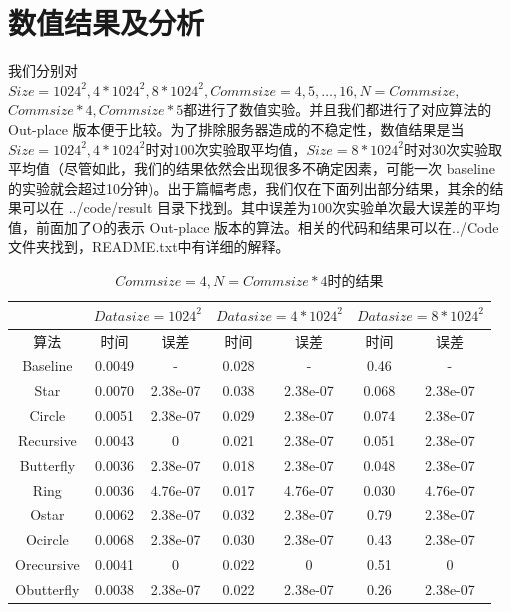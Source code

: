 \documentclass{article}
\begin{document}
\section{数值结果及分析}
我们分别对 $Size = 1024^2, 4*1024^2, 8*1024^2, Commsize=4,5,\dots,16,N = Commsize,$ $Commsize*4,Commsize*5$都进行了数值实验。并且我们都进行了对应算法的 Out-place 版本便于比较。为了排除服务器造成的不稳定性，数值结果是当$Size=1024^2, 4*1024^2$时对$100$次实验取平均值，$Size=8*1024^2$时对$30$次实验取平均值（尽管如此，我们的结果依然会出现很多不确定因素，可能一次 baseline 的实验就会超过10分钟)。出于篇幅考虑，我们仅在下面列出部分结果，其余的结果可以在 ../code/result 目录下找到。其中误差为$100$次实验单次最大误差的平均值，前面加了O的表示 Out-place 版本的算法。相关的代码和结果可以在../Code文件夹找到，README.txt中有详细的解释。
\begin{table}[H]
	\centering
	\begin{tabular}{c|cc|cc|cc}
		 & \multicolumn{2}{|c|}{$Datasize=1024^2$}  &\multicolumn{2}{|c|}{$Datasize=4*1024^2$}&\multicolumn{2}{c}{$Datasize=8*1024^2$}\\\hline
		算法 &时间 &误差 &时间 &误差 &时间 &误差\\ \hline
		Baseline &0.0049&-&0.028&-&0.46&-\\
		Star& 0.0070&2.38e-07&0.038&2.38e-07&0.068& 2.38e-07\\ 
		Circle &0.0051&2.38e-07&0.029&2.38e-07&0.074&2.38e-07\\ 
		Recursive &0.0043&0&0.021&2.38e-07&0.051&2.38e-07 \\
		Butterfly &0.0036&2.38e-07&0.018&2.38e-07&0.048&2.38e-07\\
		Ring &0.0036&4.76e-07&0.017&4.76e-07&0.030&4.76e-07\\
		Ostar &0.0062&2.38e-07&0.032&2.38e-07&0.79&2.38e-07\\
		Ocircle &0.0068&2.38e-07&0.030&2.38e-07&0.43&2.38e-07\\
		Orecursive &0.0041&0&0.022&0&0.51&0\\
		Obutterfly &0.0038&2.38e-07&0.022&2.38e-07&0.26&2.38e-07
	\end{tabular}
\caption{$Commsize = 4, N = Commsize*4$时的结果}
\end{table}
\end{document}
